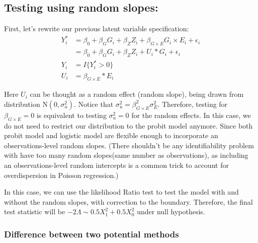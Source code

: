 \documentclass[
]{article}
\begin{document}
\hypertarget{testing-using-random-slopes}{%
\subsection{Testing using random
slopes:}\label{testing-using-random-slopes}}

First, let's rewrite our previous latent variable specification:
\begin{equation}\label{eqn:latentformulationRandomSlope}
\begin{aligned}
Y_i^* &= \beta_0 + \beta_G G_i + \beta_Z Z_i + \beta_{G\times E} G_i \times E_i + \epsilon_i \\
      &= \beta_0 + \beta_G G_i + \beta_Z Z_i + U_i * G_i + \epsilon_i \\
Y_i &= I\{Y_i^*>0\} \\
U_i &= \beta_{G\times E} * E_i
\end{aligned}
\end{equation}

Here \(U_i\) can be thought as a random effect (random slope), being
drawn from distribution \(\text{N}(0,\sigma_u^2)\). Notice that
\(\sigma_u^2 = \beta_{G\times E}^2 \sigma_E^2\). Therefore, testing for
\(\beta_{G\times E} =0\) is equivalent to testing \(\sigma_u^2 = 0\) for
the random effects. In this case, we do not need to restrict our
distribution to the probit model anymore. Since both probit model and
logistic model are flexible enough to incorporate an observations-level
random slopes. (There shouldn't be any identifiability problem with have
too many random slopes(same number as observations), as including an
observations-level random intercepts is a common trick to account for
overdispersion in Poisson regression.)

In this case, we can use the likelihood Ratio test to test the model
with and without the random slopes, with correction to the boundary.
Therefore, the final test statistic will be
\(-2\Lambda \sim 0.5X^2_1 + 0.5X^2_0\) under null hypothesis.

\hypertarget{difference-between-two-potential-methods}{%
\subsubsection{Difference between two potential
methods}\label{difference-between-two-potential-methods}}
\end{document}
